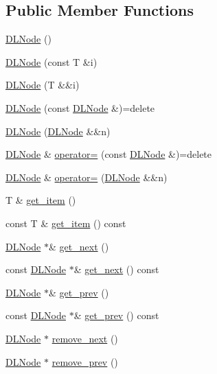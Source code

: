\subsection*{Public Member Functions}
\begin{DoxyCompactItemize}
\item 
\hyperlink{class_designar_1_1_d_l_node_aac2adda6b4d737b47d461efe02401f01}{D\+L\+Node} ()
\item 
\hyperlink{class_designar_1_1_d_l_node_af55ccc85dacdef9932b36e1ebd681306}{D\+L\+Node} (const T \&i)
\item 
\hyperlink{class_designar_1_1_d_l_node_a4c90cd184cdec513673fece07a858221}{D\+L\+Node} (T \&\&i)
\item 
\hyperlink{class_designar_1_1_d_l_node_aa70f9ca6c57dc2731ef5cff85fc849ba}{D\+L\+Node} (const \hyperlink{class_designar_1_1_d_l_node}{D\+L\+Node} \&)=delete
\item 
\hyperlink{class_designar_1_1_d_l_node_a9c80165d85c73bb4815e3ca098c1e72b}{D\+L\+Node} (\hyperlink{class_designar_1_1_d_l_node}{D\+L\+Node} \&\&n)
\item 
\hyperlink{class_designar_1_1_d_l_node}{D\+L\+Node} \& \hyperlink{class_designar_1_1_d_l_node_a790e90bcc8e4c5047e576aeaa1374291}{operator=} (const \hyperlink{class_designar_1_1_d_l_node}{D\+L\+Node} \&)=delete
\item 
\hyperlink{class_designar_1_1_d_l_node}{D\+L\+Node} \& \hyperlink{class_designar_1_1_d_l_node_a4993e8544e88f3ba0552d8e4005f6fac}{operator=} (\hyperlink{class_designar_1_1_d_l_node}{D\+L\+Node} \&\&n)
\item 
T \& \hyperlink{class_designar_1_1_d_l_node_a5f116af77588dcefd27fc92e679c27d2}{get\+\_\+item} ()
\item 
const T \& \hyperlink{class_designar_1_1_d_l_node_ac6c814f0d4d13daa3f69e6311fea83a8}{get\+\_\+item} () const
\item 
\hyperlink{class_designar_1_1_d_l_node}{D\+L\+Node} $\ast$\& \hyperlink{class_designar_1_1_d_l_node_a28ad2b7a46044b5e798e06888631bbde}{get\+\_\+next} ()
\item 
const \hyperlink{class_designar_1_1_d_l_node}{D\+L\+Node} $\ast$\& \hyperlink{class_designar_1_1_d_l_node_a2e9212d8d5bec7b811c8ca11948bdad6}{get\+\_\+next} () const
\item 
\hyperlink{class_designar_1_1_d_l_node}{D\+L\+Node} $\ast$\& \hyperlink{class_designar_1_1_d_l_node_a17271ebf6fc77a191c1a4a9c70fdb702}{get\+\_\+prev} ()
\item 
const \hyperlink{class_designar_1_1_d_l_node}{D\+L\+Node} $\ast$\& \hyperlink{class_designar_1_1_d_l_node_ad994f44ae1d1f56a318796d763361372}{get\+\_\+prev} () const
\item 
\hyperlink{class_designar_1_1_d_l_node}{D\+L\+Node} $\ast$ \hyperlink{class_designar_1_1_d_l_node_a8ff44fbe079ffd92ad09d3e6c5ec0458}{remove\+\_\+next} ()
\item 
\hyperlink{class_designar_1_1_d_l_node}{D\+L\+Node} $\ast$ \hyperlink{class_designar_1_1_d_l_node_a0bd2bf491ab61ab3fd1eb6b8b06dcae5}{remove\+\_\+prev} ()
\end{DoxyCompactItemize}


